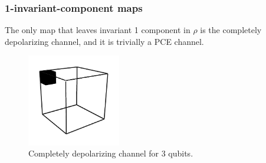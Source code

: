 \documentclass[11pt,dvipsnames]{article} %
\newcommand{\1}{\mathds{1}}
\begin{document}
\subsubsection*{1-invariant-component maps} %
The only map that leaves invariant 1 component in $\rho$ is the completely
depolarizing channel, and it is trivially a PCE channel.
\begin{figure}[H]
	\includegraphics[height=4cm]{3q-1c}
	\caption{Completely depolarizing channel for 3 qubits.}
	\label{fig:QC-3q-1c}
\end{figure}
\end{document}
